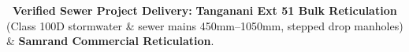 \vfill

\noindent
\begin{tcolorbox}[enhanced, colback=white, colframe=mhnavy, boxrule=0.8pt, arc=3pt, left=8pt, right=8pt, top=6pt, bottom=6pt, drop shadow=black!3]
    {\fontsize{8pt}{10.6pt}\selectfont\color{mhnavy}\bfseries\faCheckCircle\ Verified Sewer Project Delivery:}\quad
    {\fontsize{8pt}{10.6pt}\selectfont\color{mhtext}
    \textbf{Tanganani Ext 51 Bulk Reticulation} (Class 100D stormwater \& sewer mains 450mm--1050mm, stepped drop manholes) \& \textbf{Samrand Commercial Reticulation}.
    }
\end{tcolorbox}

\clearpage
